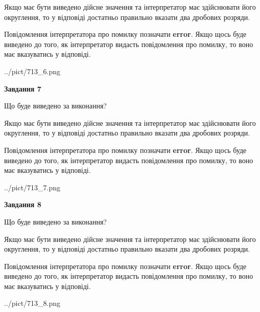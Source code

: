 \documentclass[12pt, ukrainian]{article}
\begin{document}
{\begin {Large}
Якщо має бути виведено дійсне значення та інтерпретатор має здійснювати його округлення, 
то у відповіді достатньо правильно вказати два дробових розряди.

Повідомлення інтерпретатора про помилку позначати \textbf{error}.
Якщо щось буде виведено до того, як інтерпретатор видасть повідомлення про помилку, 
то воно має вказуватись у відповіді. \par

\begin{center}
	{../pict/713_6.png}
\end{center}
\newpage

{\begin {center}\textbf{Завдання 7}\end {center}}\par
Що буде виведено за виконання? \par

Якщо має бути виведено дійсне значення та інтерпретатор має здійснювати його округлення, 
то у відповіді достатньо правильно вказати два дробових розряди.

Повідомлення інтерпретатора про помилку позначати \textbf{error}.
Якщо щось буде виведено до того, як інтерпретатор видасть повідомлення про помилку, 
то воно має вказуватись у відповіді. \par

\begin{center}
	{../pict/713_7.png}
\end{center}
\newpage

{\begin {center}\textbf{Завдання 8}\end {center}}\par
Що буде виведено за виконання? \par

Якщо має бути виведено дійсне значення та інтерпретатор має здійснювати його округлення, 
то у відповіді достатньо правильно вказати два дробових розряди.

Повідомлення інтерпретатора про помилку позначати \textbf{error}.
Якщо щось буде виведено до того, як інтерпретатор видасть повідомлення про помилку, 
то воно має вказуватись у відповіді. \par

\begin{center}
	{../pict/713_8.png}
\end{center}
\newpage


\end{Large}}
\end{document}
